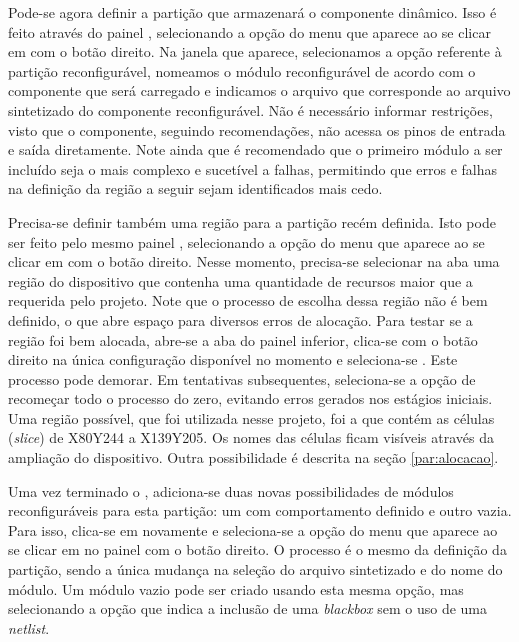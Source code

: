 \documentclass[11pt,a4paper,oneside]{book}
\begin{document}
Pode-se agora definir a partição que armazenará o componente dinâmico.
Isso é feito através do painel , selecionando a opção  do menu que aparece ao se clicar em  com o botão direito.
Na janela que aparece, selecionamos a opção referente à partição reconfigurável, nomeamos o módulo reconfigurável de acordo com o componente que será carregado e indicamos o arquivo que corresponde ao arquivo sintetizado do componente reconfigurável.
Não é necessário informar restrições, visto que o componente, seguindo recomendações, não acessa os pinos de entrada e saída diretamente.
Note ainda que é recomendado que o primeiro módulo a ser incluído seja o mais complexo e sucetível a falhas, permitindo que erros e falhas na definição da região a seguir sejam identificados mais cedo.

Precisa-se definir também uma região para a partição recém definida.
Isto pode ser feito pelo mesmo painel , selecionando a opção  do menu que aparece ao se clicar em  com o botão direito.
Nesse momento, precisa-se selecionar na aba  uma região do dispositivo que contenha uma quantidade de recursos maior que a requerida pelo projeto.
Note que o processo de escolha dessa região não é bem definido, o que abre espaço para diversos erros de alocação.
Para testar se a região foi bem alocada, abre-se a aba  do painel inferior, clica-se com o botão direito na única configuração disponível no momento e seleciona-se .
Este processo pode demorar.
Em tentativas subsequentes, seleciona-se a opção de recomeçar todo o processo do zero, evitando erros gerados nos estágios iniciais.
Uma região possível, que foi utilizada nesse projeto, foi a que contém as células (\textit{slice}) de X80Y244 a X139Y205.
Os nomes das células ficam visíveis através da ampliação do dispositivo.
Outra possibilidade é descrita na seção \ref{par:alocacao}.

Uma vez terminado o , adiciona-se duas novas possibilidades de módulos reconfiguráveis para esta partição: um com comportamento definido e outro vazia.
Para isso, clica-se em  novamente e seleciona-se a opção  do menu que aparece ao se clicar em  no painel  com o botão direito.
O processo é o mesmo da definição da partição, sendo a única mudança na seleção do arquivo sintetizado e do nome do módulo.
Um módulo vazio pode ser criado usando esta mesma opção, mas selecionando a opção que indica a inclusão de uma \textit{blackbox} sem o uso de uma \textit{netlist}.
\end{document}
